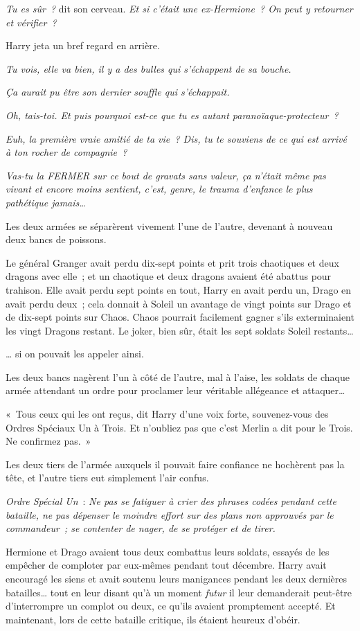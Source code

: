 \emph{Tu es sûr~?} dit son cerveau.
\emph{Et si c'était une ex-Hermione~?
On peut y retourner et vérifier~?}

Harry jeta un bref regard en arrière.

\emph{Tu vois, elle va bien, il y a des bulles qui s'échappent de sa bouche.}

\emph{Ça aurait pu être son dernier souffle qui s'échappait.}

\emph{Oh, tais-toi.
Et puis pourquoi est-ce que tu es autant paranoïaque-protecteur~?}

\emph{Euh, la première vraie amitié de ta vie~?
Dis, tu te souviens de ce qui est arrivé à ton rocher de compagnie~?}

\emph{Vas-tu la FERMER sur ce bout de gravats sans valeur, ça n'était même pas vivant et encore moins sentient, c'est, genre, le trauma d'enfance le plus pathétique jamais…}

Les deux armées se séparèrent vivement l'une de l'autre, devenant à nouveau deux bancs de poissons.

Le général Granger avait perdu dix-sept points et prit trois chaotiques et deux dragons avec elle~; et un chaotique et deux dragons avaient été abattus pour trahison.
Elle avait perdu sept points en tout, Harry en avait perdu un, Drago en avait perdu deux~; cela donnait à Soleil un avantage de vingt points sur Drago et de dix-sept points sur Chaos.
Chaos pourrait facilement gagner s'ils exterminaient les vingt Dragons restant.
Le joker, bien sûr, était les sept soldats Soleil restants…

… si on pouvait les appeler ainsi.

Les deux bancs nagèrent l'un à côté de l'autre, mal à l'aise, les soldats de chaque armée attendant un ordre pour proclamer leur véritable allégeance et attaquer…

«~Tous ceux qui les ont reçus, dit Harry d'une voix forte, souvenez-vous des Ordres Spéciaux Un à Trois.
Et n'oubliez pas que c'est Merlin a dit pour le Trois.
Ne confirmez pas.~»

Les deux tiers de l'armée auxquels il pouvait faire confiance ne hochèrent pas la tête, et l'autre tiers eut simplement l'air confus.

\emph{Ordre Spécial Un}~: \emph{Ne pas se fatiguer à crier des phrases codées pendant cette bataille, ne pas dépenser le moindre effort sur des plans non approuvés par le commandeur~; se contenter de nager, de se protéger et de tirer.}

Hermione et Drago avaient tous deux combattus leurs soldats, essayés de les empêcher de comploter par eux-mêmes pendant tout décembre.
Harry avait encouragé les siens et avait soutenu leurs manigances pendant les deux dernières batailles… tout en leur disant qu'à un moment \emph{futur} il leur demanderait peut-être d'interrompre un complot ou deux, ce qu'ils avaient promptement accepté.
Et maintenant, lors de cette bataille critique, ils étaient heureux d'obéir.


